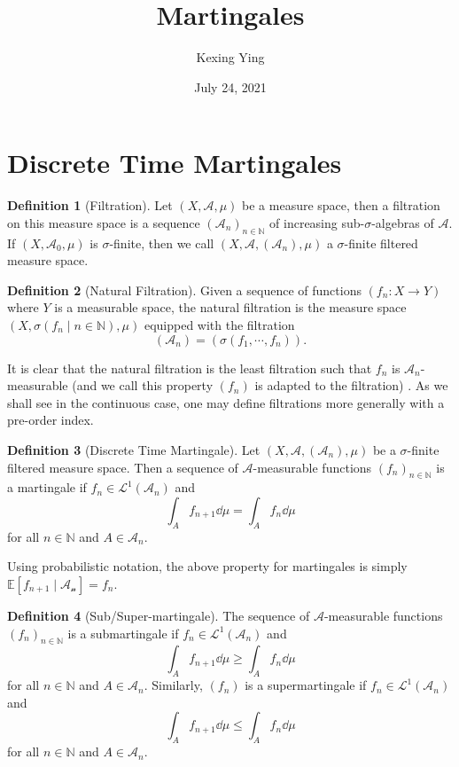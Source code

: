 \documentclass[]{article}
\title{Martingales}
\author{Kexing Ying}
\date{July 24, 2021}
\theoremstyle{definition}
\theoremstyle{definition}
\newtheorem{definition}{Definition}
\begin{document}
\maketitle

\section{Discrete Time Martingales}

\begin{definition}[Filtration]
  Let \((X, \mathcal{A}, \mu)\) be a measure space, then a filtration on this 
  measure space is a sequence \((\mathcal{A}_n)_{n \in \mathbb{N}}\) of 
  increasing sub-\(\sigma\)-algebras of \(\mathcal{A}\). If 
  \((X, \mathcal{A}_0, \mu)\) is \(\sigma\)-finite, then we call 
  \((X, \mathcal{A}, (\mathcal{A}_n), \mu)\) a \(\sigma\)-finite filtered 
  measure space.
\end{definition}

\begin{definition}[Natural Filtration]
  Given a sequence of functions \((f_n : X \to Y)\) where \(Y\) is a measurable 
  space, the natural filtration is the measure space 
  \((X, \sigma(f_n \mid n \in \mathbb{N}), \mu)\) equipped with the filtration
  \[(\mathcal{A}_n) = (\sigma(f_1, \cdots, f_n)).\]
\end{definition}

It is clear that the natural filtration is the least filtration such that \(f_n\) 
is \(\mathcal{A}_n\)-measurable (and we call this property \((f_n)\) is adapted 
to the filtration) . As we shall see in the continuous case, one 
may define filtrations more generally with a pre-order index. 

\begin{definition}[Discrete Time Martingale]
  Let \((X, \mathcal{A}, (\mathcal{A}_n), \mu)\) be a \(\sigma\)-finite filtered 
  measure space. Then a sequence of \(\mathcal{A}\)-measurable functions 
  \((f_n)_{n \in \mathbb{N}}\) is a martingale if 
  \(f_n \in \mathcal{L}^1(\mathcal{A}_n)\) and 
  \[\int_A f_{n + 1} \dd \mu = \int_A f_n \dd \mu\]
  for all \(n \in \mathbb{N}\) and \(A \in \mathcal{A}_n\).
\end{definition}

Using probabilistic notation, the above property for martingales is simply 
\(\mathbb{E}[f_{n + 1} \mid \mathcal{A_n}] = f_n\).

\begin{definition}[Sub/Super-martingale]
  The sequence of \(\mathcal{A}\)-measurable functions \((f_n)_{n \in \mathbb{N}}\) 
  is a submartingale if \(f_n \in \mathcal{L}^1(\mathcal{A}_n)\) and 
  \[\int_A f_{n + 1} \dd \mu \ge \int_A f_n \dd \mu\]
  for all \(n \in \mathbb{N}\) and \(A \in \mathcal{A}_n\). Similarly, \((f_n)\) 
  is a supermartingale if \(f_n \in \mathcal{L}^1(\mathcal{A}_n)\) and 
  \[\int_A f_{n + 1} \dd \mu \le \int_A f_n \dd \mu\]
  for all \(n \in \mathbb{N}\) and \(A \in \mathcal{A}_n\).
\end{definition}
\end{document}
